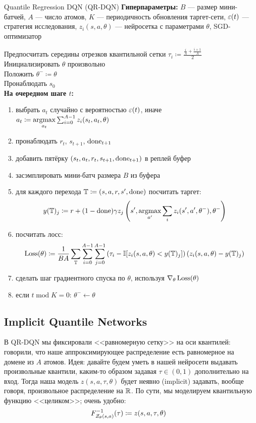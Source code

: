 \begin{algorithm}[label = QRDQNalgorithm]{Quantile Regression DQN (QR-DQN)}
\textbf{Гиперпараметры:} $B$ --- размер мини-батчей, $A$ --- число атомов, $K$ --- периодичность обновления таргет-сети, $\varepsilon(t)$ --- стратегия исследования, $z_i(s, a, \theta)$ --- нейросетка с параметрами $\theta$, SGD-оптимизатор

\vspace{0.3cm}
Предпосчитать середины отрезков квантильной сетки $\tau_i \coloneqq \frac{\frac{i}{A} + \frac{i+1}{A}}{2}$ \\
Инициализировать $\theta$ произвольно \\
Положить $\theta^- \coloneqq \theta$ \\
Пронаблюдать $s_0$ \\
\textbf{На очередном шаге $t$:}
\begin{enumerate}
    \item выбрать $a_t$ случайно с вероятностью $\varepsilon(t)$, иначе $a_t \coloneqq \mathop{\mathrm{argmax}}\limits_{a_t} \sum_{i=0}^{A-1} z_i(s_t, a_t, \theta)$
    \item пронаблюдать $r_t$,  $s_{t+1}$, $\mathrm{done}_{t+1}$
    \item добавить пятёрку $(s_t, a_t, r_t, s_{t+1}, \mathrm{done}_{t+1})$ в реплей буфер
    \item засэмплировать мини-батч размера $B$ из буфера
    \item для каждого перехода $\mathbb{T} \coloneqq (s, a, r, s', \mathrm{done})$ посчитать таргет:
    $$y(\mathbb{T})_j \coloneqq r + (1 - \mathrm{done})\gamma z_j\left( s', \mathop{\mathrm{argmax}}\limits_{a'} \sum_{i} z_i(s', a', \theta^-), \theta^- \right) $$
    \item посчитать лосс:
    $$\operatorname{Loss}(\theta) \coloneqq \frac{1}{BA}\sum_{\mathbb{T}} \sum_{i=0}^{A-1} \sum_{j=0}^{A-1} \left( \tau_i - \mathbb{I}[z_i(s, a, \theta) < y(\mathbb{T})_j] \right) \left( z_i(s, a, \theta) - y(\mathbb{T})_j \right)$$
    \item сделать шаг градиентного спуска по $\theta$, используя $\nabla_\theta \operatorname{Loss}(\theta)$
    \item если $t \operatorname{mod} K = 0$: $\theta^- \gets \theta$
\end{enumerate}
\end{algorithm}

\subsection{Implicit Quantile Networks}\label{subsec:iqn}

В QR-DQN мы фиксировали <<равномерную сетку>> на оси квантилей: говорили, что наше аппроксимирующее распределение есть равномерное на домене из $A$ атомов. Идея: давайте будем уметь в нашей нейросети выдавать произвольные квантили, каким-то образом задавая $\tau \in (0, 1)$ дополнительно на вход. Тогда наша модель $z(s, a, \tau, \theta)$ будет неявно (implicit) задавать, вообще говоря, произвольное распределение на $\mathbb{R}$. По сути, мы моделируем квантильную функцию <<целиком>>; очень удобно:
$$F^{-1}_{\mathcal{Z}_{\theta}(s, a)}(\tau) \coloneqq z(s, a, \tau, \theta)$$

